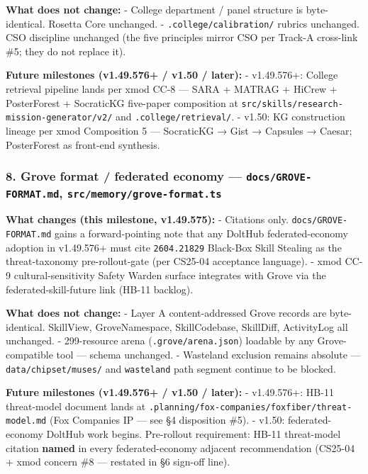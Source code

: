 \documentclass[11pt,letterpaper]{article}
\newcommand{\arxivid}[1]{\texttt{\textcolor{accent}{#1}}}
\begin{document}
\textbf{What does not change:} - College department / panel structure is
byte-identical. Rosetta Core unchanged. - \texttt{.college/calibration/}
rubrics unchanged. CSO discipline unchanged (the five principles mirror
CSO per Track-A cross-link \#5; they do not replace it).

\textbf{Future milestones (v1.49.576+ / v1.50 / later):} - v1.49.576+:
College retrieval pipeline lands per xmod CC-8 --- SARA + MATRAG +
HiCrew + PosterForest + SocraticKG five-paper composition at
\texttt{src/skills/research-mission-generator/v2/} and
\texttt{.college/retrieval/}. - v1.50: KG construction lineage per xmod
Composition 5 --- SocraticKG → Gist → Capsules → Caesar; PosterForest as
front-end synthesis.

\subsubsection{\texorpdfstring{8. Grove format / federated economy ---
\texttt{docs/GROVE-FORMAT.md},
\texttt{src/memory/grove-format.ts}}{8. Grove format / federated economy --- docs/GROVE-FORMAT.md, src/memory/grove-format.ts}}

\textbf{What changes (this milestone, v1.49.575):} - Citations only.
\texttt{docs/GROVE-FORMAT.md} gains a forward-pointing note that any
DoltHub federated-economy adoption in v1.49.576+ must cite
\arxivid{2604.21829} Black-Box Skill Stealing as the threat-taxonomy
pre-rollout-gate (per CS25-04 acceptance language). - xmod CC-9
cultural-sensitivity Safety Warden surface integrates with Grove via the
federated-skill-future link (HB-11 backlog).

\textbf{What does not change:} - Layer A content-addressed Grove records
are byte-identical. SkillView, GroveNamespace, SkillCodebase, SkillDiff,
ActivityLog all unchanged. - 299-resource arena
(\texttt{.grove/arena.json}) loadable by any Grove-compatible tool ---
schema unchanged. - Wasteland exclusion remains absolute ---
\texttt{data/chipset/muses/} and \texttt{wasteland} path segment
continue to be blocked.

\textbf{Future milestones (v1.49.576+ / v1.50 / later):} - v1.49.576+:
HB-11 threat-model document lands at
\texttt{.planning/fox-companies/foxfiber/threat-model.md} (Fox Companies
IP --- see §4 disposition \#5). - v1.50: federated-economy DoltHub work
begins. Pre-rollout requirement: HB-11 threat-model citation
\textbf{named} in every federated-economy adjacent recommendation
(CS25-04 + xmod concern \#8 --- restated in §6 sign-off line).
\end{document}
